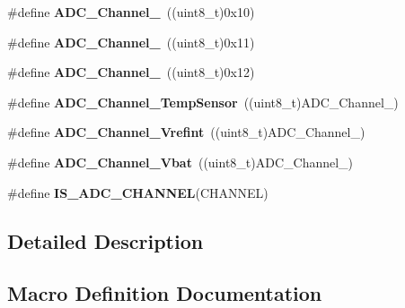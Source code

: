 \begin{DoxyCompactItemize}
\item 
\hypertarget{group___a_d_c__channels_ga52fb09ae9a0333a0e071da106466c659}{}\#define {\bfseries A\+D\+C\+\_\+\+Channel\+\_}~((uint8\+\_\+t)0x10)\label{group___a_d_c__channels_ga52fb09ae9a0333a0e071da106466c659}

\item 
\hypertarget{group___a_d_c__channels_ga58cdfe3a5625f198116d163b09698cea}{}\#define {\bfseries A\+D\+C\+\_\+\+Channel\+\_}~((uint8\+\_\+t)0x11)\label{group___a_d_c__channels_ga58cdfe3a5625f198116d163b09698cea}

\item 
\hypertarget{group___a_d_c__channels_gacc9277b9f14b55c5dff2f493dc5e7797}{}\#define {\bfseries A\+D\+C\+\_\+\+Channel\+\_}~((uint8\+\_\+t)0x12)\label{group___a_d_c__channels_gacc9277b9f14b55c5dff2f493dc5e7797}

\item 
\hypertarget{group___a_d_c__channels_ga1efc096b8d4a8d15c4a7d91f5c03c6c7}{}\#define {\bfseries A\+D\+C\+\_\+\+Channel\+\_\+\+Temp\+Sensor}~((uint8\+\_\+t)A\+D\+C\+\_\+\+Channel\+\_)\label{group___a_d_c__channels_ga1efc096b8d4a8d15c4a7d91f5c03c6c7}

\item 
\hypertarget{group___a_d_c__channels_ga5d48ded5138e6f1efe3a7634eff4d125}{}\#define {\bfseries A\+D\+C\+\_\+\+Channel\+\_\+\+Vrefint}~((uint8\+\_\+t)A\+D\+C\+\_\+\+Channel\+\_)\label{group___a_d_c__channels_ga5d48ded5138e6f1efe3a7634eff4d125}

\item 
\hypertarget{group___a_d_c__channels_gae86cee19a99a31d5ed3f95f64d81301a}{}\#define {\bfseries A\+D\+C\+\_\+\+Channel\+\_\+\+Vbat}~((uint8\+\_\+t)A\+D\+C\+\_\+\+Channel\+\_)\label{group___a_d_c__channels_gae86cee19a99a31d5ed3f95f64d81301a}

\item 
\#define {\bfseries I\+S\+\_\+\+A\+D\+C\+\_\+\+C\+H\+A\+N\+N\+E\+L}(C\+H\+A\+N\+N\+E\+L)
\end{DoxyCompactItemize}


\subsection{Detailed Description}


\subsection{Macro Definition Documentation}
\hypertarget{group___a_d_c__channels_gaba41910dcb2b449c613a5ef638862e77}{}
